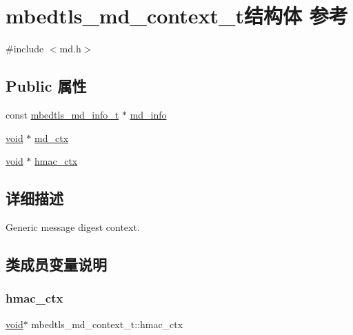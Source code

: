 \hypertarget{structmbedtls__md__context__t}{}\section{mbedtls\+\_\+md\+\_\+context\+\_\+t结构体 参考}
\label{structmbedtls__md__context__t}


{\ttfamily \#include $<$md.\+h$>$}

\subsection*{Public 属性}
\begin{DoxyCompactItemize}
\item 
const \hyperlink{structmbedtls__md__info__t}{mbedtls\+\_\+md\+\_\+info\+\_\+t} $\ast$ \hyperlink{structmbedtls__md__context__t_a946ec8104697a039cf1990233cd41b28}{md\+\_\+info}
\item 
\hyperlink{interfacevoid}{void} $\ast$ \hyperlink{structmbedtls__md__context__t_af7dc1e93cbd6f9a3c52d1a5064732fe1}{md\+\_\+ctx}
\item 
\hyperlink{interfacevoid}{void} $\ast$ \hyperlink{structmbedtls__md__context__t_aabd68159641f26735e93b0b002d9ddce}{hmac\+\_\+ctx}
\end{DoxyCompactItemize}


\subsection{详细描述}
Generic message digest context. 

\subsection{类成员变量说明}
\mbox{\label{structmbedtls__md__context__t_aabd68159641f26735e93b0b002d9ddce}} 
\subsubsection{\texorpdfstring{hmac\+\_\+ctx}{hmac\_ctx}}
{\footnotesize\ttfamily \hyperlink{interfacevoid}{void}$\ast$ mbedtls\+\_\+md\+\_\+context\+\_\+t\+::hmac\+\_\+ctx}

